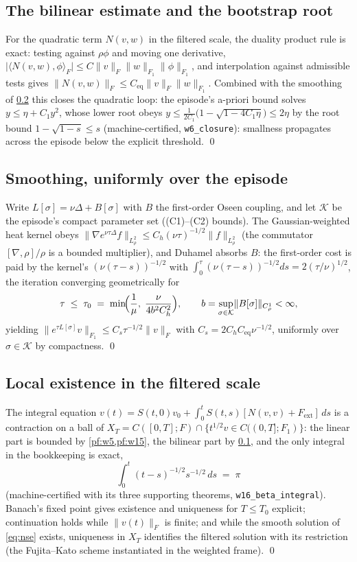 \documentclass[11pt,letterpaper]{amsart}
\theoremstyle{definition}
\theoremstyle{remark}
\newcommand{\norm}[1]{\lVert #1 \rVert}
\newcommand{\abs}[1]{\lvert #1 \rvert}
\begin{document}
\subsection{The bilinear estimate and the bootstrap root}\label{pf:w6}
For the quadratic term $N(v,w)$ in the filtered scale, the duality product rule is
exact: testing against $\rho\phi$ and moving one derivative,
$\abs{\langle N(v,w),\phi\rangle_F}\le C\norm{v}_F\norm{w}_{F_1}\norm{\phi}_{F_1}$,
and interpolation against admissible tests gives
$\norm{N(v,w)}_{F}\le C_{\mathrm{eq}}\norm{v}_F\norm{w}_{F_1}$. Combined with the
smoothing of \cref{pf:w15} this closes the quadratic loop: the episode's a-priori
bound solves $y\le\eta+C_1y^2$, whose lower root obeys
$y\le\tfrac{1}{2C_1}\bigl(1-\sqrt{1-4C_1\eta}\bigr)\le2\eta$ by the root bound
$1-\sqrt{1-s}\le s$ (machine-certified, \texttt{w6\_closure}): smallness propagates
across the episode below the explicit threshold. \qed

\subsection{Smoothing, uniformly over the episode}\label{pf:w15}
Write $L[\sigma]=\nu\Delta+B[\sigma]$ with $B$ the first-order Oseen coupling, and let
$\mathcal{K}$ be the episode's compact parameter set ((C1)--(C2) bounds). The
Gaussian-weighted heat kernel obeys
$\norm{\nabla e^{\nu\tau\Delta}f}_{L^2_\rho}\le C_h(\nu\tau)^{-1/2}\norm{f}_{L^2_\rho}$
(the commutator $[\nabla,\rho]/\rho$ is a bounded multiplier), and Duhamel absorbs
$B$: the first-order cost is paid by the kernel's $(\nu(\tau-s))^{-1/2}$ with
$\int_0^\tau(\nu(\tau-s))^{-1/2}ds=2(\tau/\nu)^{1/2}$, the iteration converging
geometrically for
\[
\tau\;\le\;\tau_0\;=\;\min\!\Bigl(\frac{1}{\mu},\;\frac{\nu}{4b^2C_h^2}\Bigr),
\qquad b=\sup_{\sigma\in\mathcal{K}}\norm{B[\sigma]}_{C^1_\rho}<\infty,
\]
yielding $\norm{e^{\tau L[\sigma]}v}_{F_1}\le C_s\tau^{-1/2}\norm{v}_F$ with
$C_s=2C_hC_{\mathrm{eq}}\nu^{-1/2}$, uniformly over $\sigma\in\mathcal{K}$ by
compactness. \qed

\subsection{Local existence in the filtered scale}\label{pf:w16}
The integral equation $v(t)=S(t,0)v_0+\int_0^tS(t,s)[N(v,v)+F_{\mathrm{ext}}]\,ds$
is a contraction on a ball of
$X_T=C([0,T];F)\cap\{t^{1/2}v\in C((0,T];F_1)\}$: the linear part is bounded by
\cref{pf:w5,pf:w15}, the bilinear part by \cref{pf:w6}, and the only integral in the
bookkeeping is exact,
\[
\int_0^t(t-s)^{-1/2}s^{-1/2}\,ds\;=\;\pi
\]
(machine-certified with its three supporting theorems, \texttt{w16\_beta\_integral}).
Banach's fixed point gives existence and uniqueness for $T\le T_0$ explicit;
continuation holds while $\norm{v(t)}_F$ is finite; and while the smooth solution of
\eqref{eq:nse} exists, uniqueness in $X_T$ identifies the filtered solution with its
restriction (the Fujita--Kato scheme \cite{FujitaKato1964,Kato1984} instantiated in
the weighted frame). \qed
\end{document}
